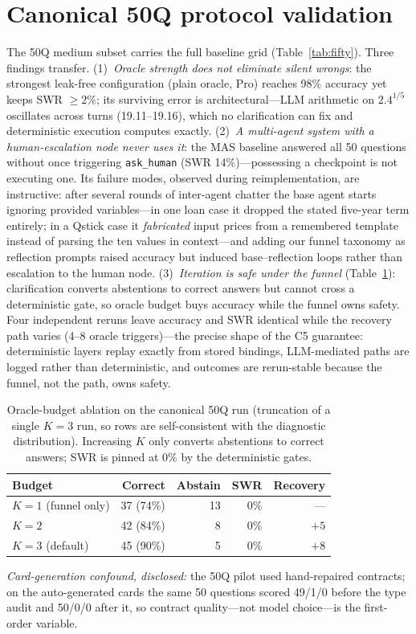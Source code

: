 \section{Canonical 50Q protocol validation}\label{app:fiftyq}
The 50Q medium subset carries the full baseline grid (Table~\ref{tab:fifty}).
Three findings transfer.
(1)~\emph{Oracle strength does not eliminate silent wrongs}: the strongest leak-free configuration (plain oracle, Pro) reaches 98\% accuracy yet keeps SWR $\geq2\%$; its surviving error is architectural---LLM arithmetic on $2.4^{1/5}$ oscillates across turns (19.11--19.16), which no clarification can fix and deterministic execution computes exactly.
(2)~\emph{A multi-agent system with a human-escalation node never uses it}: the MAS baseline answered all 50 questions without once triggering \texttt{ask\_human} (SWR 14\%)---possessing a checkpoint is not executing one.
Its failure modes, observed during reimplementation, are instructive: after several rounds of inter-agent chatter the base agent starts ignoring provided variables---in one loan case it dropped the stated five-year term entirely; in a Qstick case it \emph{fabricated} input prices from a remembered template instead of parsing the ten values in context---and adding our funnel taxonomy as reflection prompts raised accuracy but induced base--reflection loops rather than escalation to the human node.
(3)~\emph{Iteration is safe under the funnel} (Table~\ref{tab:ablation}): clarification converts abstentions to correct answers but cannot cross a deterministic gate, so oracle budget buys accuracy while the funnel owns safety.
Four independent reruns leave accuracy and SWR identical while the recovery path varies (4--8 oracle triggers)---the precise shape of the C5 guarantee: deterministic layers replay exactly from stored bindings, LLM-mediated paths are logged rather than deterministic, and outcomes are rerun-stable because the funnel, not the path, owns safety.

\begin{table}[t]
\caption{Oracle-budget ablation on the canonical 50Q run (truncation of a single $K{=}3$ run, so rows are self-consistent with the diagnostic distribution). Increasing $K$ only converts abstentions to correct answers; SWR is pinned at 0\% by the deterministic gates.}
\label{tab:ablation}
\small
\begin{tabular}{@{}lrrrr@{}}
\toprule
Budget & Correct & Abstain & SWR & Recovery \\
\midrule
$K{=}1$ (funnel only) & 37 (74\%) & 13 & 0\% & --- \\
$K{=}2$ & 42 (84\%) & 8 & 0\% & $+5$ \\
$K{=}3$ (default) & 45 (90\%) & 5 & 0\% & $+8$ \\
\bottomrule
\end{tabular}
\end{table}
\emph{Card-generation confound, disclosed:} the 50Q pilot used hand-repaired contracts; on the auto-generated cards the same 50 questions scored 49/1/0 before the type audit and 50/0/0 after it, so contract quality---not model choice---is the first-order variable.

